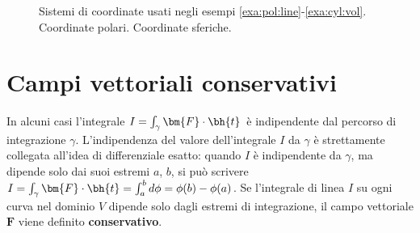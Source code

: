 \begin{remark}
\begin{figure}[h]
\centering
 \quad
{}
\caption{Sistemi di coordinate usati negli esempi \ref{exa:pol:line}-\ref{exa:cyl:vol}. \protect{} Coordinate polari. \protect{} Coordinate sferiche.}\label{fig:elementary} 
\end{figure}

\end{remark} 


\section{Campi vettoriali conservativi}

In alcuni casi l'integrale $I = \int_\gamma \bm{F} \cdot \bh{t}$ è indipendente dal percorso di integrazione $\gamma$. L'indipendenza del valore dell'integrale $I$ da $\gamma$ è strettamente collegata all'idea di differenziale esatto: quando $I$ è indipendente da $\gamma$, ma dipende solo dai suoi estremi $a$, $b$, si può scrivere $I = \int_\gamma \bm{F} \cdot \bh{t} = \int_a^b d\phi = \phi(b) - \phi(a)$. Se l'integrale di linea $I$ su ogni curva nel dominio $V$ dipende solo dagli estremi di integrazione, il campo vettoriale $\bm{F}$ viene definito \textbf{conservativo}.

